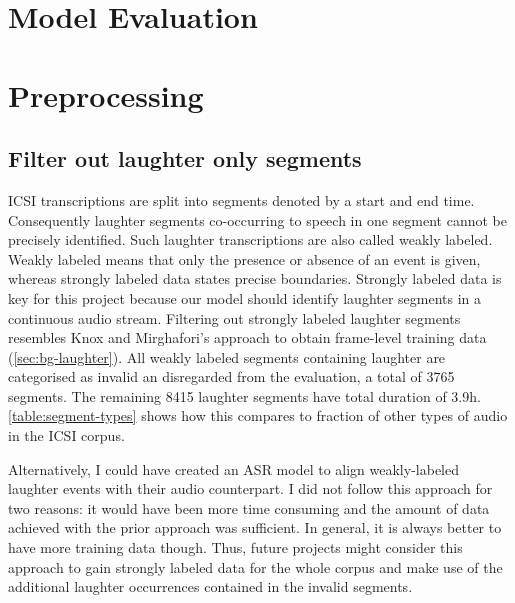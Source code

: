 \documentclass[bsc,frontabs,parskip,deptreport]{infthesis}
\begin{document}
\section{Model Evaluation} \label{sec:model-eval}
\section{Preprocessing} \label{sec:preprocessing}
\subsection{Filter out laughter only segments} \label{subsec:filter-laughter}
ICSI transcriptions are split into segments denoted by a start and end time.
Consequently laughter segments co-occurring to speech in one segment cannot be precisely identified.
Such laughter transcriptions are also called weakly labeled. Weakly labeled means that only the presence or absence of an event is given, whereas strongly labeled data states precise boundaries.
Strongly labeled data is key for this project because our model should identify laughter segments in a continuous audio stream.
Filtering out strongly labeled laughter segments resembles Knox and Mirghafori's approach to obtain frame-level training data \citep{knox2006automatic} (\autoref{sec:bg-laughter}). 
All weakly labeled segments containing laughter are categorised as invalid an disregarded from the evaluation, a total of 3765 segments.
The remaining 8415 laughter segments have total duration of 3.9h. \autoref{table:segment-types} shows how this compares to fraction of other types of audio in the ICSI corpus.

Alternatively, I could have created an ASR model to align weakly-labeled laughter events with their audio counterpart. 
I did not follow this approach for two reasons: it would have been more time consuming and the amount of data achieved with the prior approach was sufficient. 
In general, it is always better to have more training data though. Thus, future projects might consider this approach to gain strongly labeled data for the whole corpus and make use of the additional laughter occurrences contained in the invalid segments. 
\end{document}
